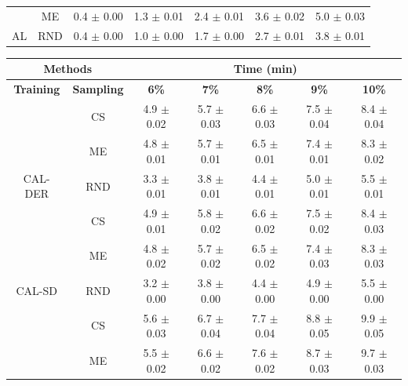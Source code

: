 \begin{table}[htbp]
\begin{tabular*}{\linewidth}{c|c|@{\extracolsep{\fill}}ccccc}
 & ME & 0.4 $\pm$ {\small 0.00} & 1.3 $\pm$ {\small 0.01} & 2.4 $\pm$ {\small 0.01} & 3.6 $\pm$ {\small 0.02} & 5.0 $\pm$ {\small 0.03}\\

\multirow{-3}{*}{\raggedright\arraybackslash AL} & RND & 0.4 $\pm$ {\small 0.00} & 1.0 $\pm$ {\small 0.00} & 1.7 $\pm$ {\small 0.00} & 2.7 $\pm$ {\small 0.01} & 3.8 $\pm$ {\small 0.01}\\
\bottomrule
\end{tabular*}
\vspace{0.5em}

\begin{tabular*}{\linewidth}{c|c|@{\extracolsep{\fill}}ccccc}
\toprule
\multicolumn{2}{c|}{\textbf{Methods}} & \multicolumn{5}{c}{\textbf{Time (min)}} \\
\midrule
\textbf{Training} & \textbf{Sampling} & \textbf{6\%} & \textbf{7\%} & \textbf{8\%} & \textbf{9\%} & \textbf{10\%}\\
\midrule
 & CS & 4.9 $\pm$ {\small 0.02} & 5.7 $\pm$ {\small 0.03} & 6.6 $\pm$ {\small 0.03} & 7.5 $\pm$ {\small 0.04} & 8.4 $\pm$ {\small 0.04}\\

 & ME & 4.8 $\pm$ {\small 0.01} & 5.7 $\pm$ {\small 0.01} & 6.5 $\pm$ {\small 0.01} & 7.4 $\pm$ {\small 0.01} & 8.3 $\pm$ {\small 0.02}\\

\multirow{-3}{*}{\raggedright\arraybackslash CAL-DER} & RND & 3.3 $\pm$ {\small 0.01} & 3.8 $\pm$ {\small 0.01} & 4.4 $\pm$ {\small 0.01} & 5.0 $\pm$ {\small 0.01} & 5.5 $\pm$ {\small 0.01}\\
\midrule
 & CS & 4.9 $\pm$ {\small 0.01} & 5.8 $\pm$ {\small 0.02} & 6.6 $\pm$ {\small 0.02} & 7.5 $\pm$ {\small 0.02} & 8.4 $\pm$ {\small 0.03}\\

 & ME & 4.8 $\pm$ {\small 0.02} & 5.7 $\pm$ {\small 0.02} & 6.5 $\pm$ {\small 0.02} & 7.4 $\pm$ {\small 0.03} & 8.3 $\pm$ {\small 0.03}\\

\multirow{-3}{*}{\raggedright\arraybackslash CAL-SD} & RND & 3.2 $\pm$ {\small 0.00} & 3.8 $\pm$ {\small 0.00} & 4.4 $\pm$ {\small 0.00} & 4.9 $\pm$ {\small 0.00} & 5.5 $\pm$ {\small 0.00}\\
\midrule
 & CS & 5.6 $\pm$ {\small 0.03} & 6.7 $\pm$ {\small 0.04} & 7.7 $\pm$ {\small 0.04} & 8.8 $\pm$ {\small 0.05} & 9.9 $\pm$ {\small 0.05}\\

 & ME & 5.5 $\pm$ {\small 0.02} & 6.6 $\pm$ {\small 0.02} & 7.6 $\pm$ {\small 0.02} & 8.7 $\pm$ {\small 0.03} & 9.7 $\pm$ {\small 0.03}\\


\end{tabular*}
\end{table}
